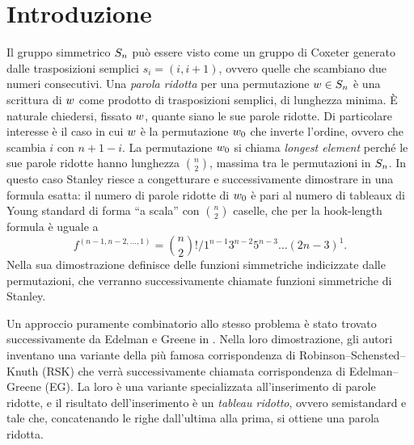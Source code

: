 
\chapter*{Introduzione}

Il gruppo simmetrico $S_n$ pu\`o essere visto come un gruppo di Coxeter
generato dalle trasposizioni semplici $s_i = (i, i+1)$, ovvero quelle che scambiano
due numeri consecutivi.
Una \emph{parola ridotta} per una permutazione $w \in S_n$ \`e una scrittura
di $w$ come prodotto di trasposizioni semplici, di lunghezza minima.
\`E naturale chiedersi, fissato $w$, quante siano le sue parole ridotte.
Di particolare interesse \`e il caso in cui $w$ \`e la permutazione $w_0$
che inverte l'ordine, ovvero che scambia $i$ con $n+1-i$.
La permutazione $w_0$ si chiama \emph{longest element} perch\'e le sue
parole ridotte hanno lunghezza $\binom n 2$, massima tra le permutazioni in $S_n$.
In questo caso Stanley riesce a congetturare
e successivamente dimostrare in \cite{stanley-84} una formula esatta:
il numero di parole ridotte di $w_0$ \`e pari al numero di tableaux di Young
standard di forma ``a scala'' con $\binom n 2$ caselle,
che per la hook-length formula \`e uguale a
\[
    f^{(n-1,n-2,\dots,1)} =
    {\binom n 2 !} \bigg/ 1^{n-1} 3^{n-2} 5^{n-3} \dots (2n-3)^1.
\]
Nella sua dimostrazione definisce delle funzioni simmetriche indicizzate dalle
permutazioni, che verranno successivamente chiamate funzioni simmetriche di
Stanley.

Un approccio puramente combinatorio allo stesso problema \`e stato trovato
successivamente da Edelman e Greene in \cite{edelman-greene-87}.
Nella loro dimostrazione, gli autori inventano una variante della
pi\`u famosa corrispondenza di Robinson--Schensted--Knuth (RSK) che verr\`a successivamente
chiamata corrispondenza di Edelman--Greene (EG).
La loro \`e una variante specializzata all'inserimento di parole ridotte, e il
risultato dell'inserimento \`e un \emph{tableau ridotto}, ovvero semistandard
e tale che, concatenando le righe dall'ultima alla prima, si ottiene una parola ridotta.

